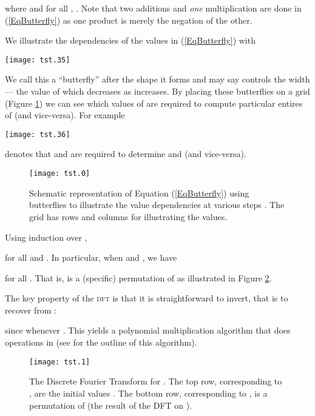 \documentclass[12pt]{article}
\theoremstyle{definition}
\newcommand{\0}{\mathbf{0}}
\theoremstyle{theorem}
\theoremstyle{definition}
\begin{document}
where  and for all ,  . Note that two additions and \emph{one} multiplication are done in (\ref{EqButterfly}) as one product is merely the negation of the other.\medskip

We illustrate the dependencies of the  values in (\ref{EqButterfly}) with \begin{center}
   \texttt{[image: tst.35]}
\end{center}
We call this a ``butterfly'' after the shape it forms and may say  controls the width --- the value of which decreases as  increases. By placing these butterflies on a  grid  (Figure \ref{Butterfly}) we can see which values of  are required to compute particular entires of  (and vice-versa). For example
\begin{center}
   \texttt{[image: tst.36]}\;\;\;\;\;\;\;\;\end{center}
denotes that  and  are required to determine  and  (and vice-versa).\medskip

\begin{figure}[htbp]
\begin{center}
\texttt{[image: tst.0]}
\caption{Schematic representation of Equation (\ref{EqButterfly}) using butterflies to illustrate the value dependencies at various steps . The grid has rows  and columns  for illustrating the  values.}
\label{Butterfly}
\end{center}
\end{figure}


Using induction over ,

for all  and  \cite{TFT2}. In particular, when  and , we have

for all . That is,  is a (specific) permutation of  as illustrated in Figure \ref{FFT1}.

The key property of the \textsc{dft} is that it is straightforward to invert, that is to recover  from :

since  whenever . This yields a polynomial multiplication algorithm that does  operations in  (see \cite[\S4.7]{AFCA} for the outline of this algorithm).


\begin{figure}[htbp]
\begin{center}
\texttt{[image: tst.1]}
\caption{The Discrete Fourier Transform for . The top row, corresponding to , are the initial values . The bottom row, corresponding to , is a permutation of  (the result of the DFT on ).}
\label{FFT1}
\end{center}
\end{figure}
\end{document}
